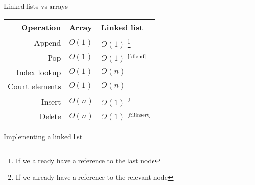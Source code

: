 \newcommand{\footnoteref}[1]{$^{\text{\ref{#1}}}$}

\begin{frame}{Linked lists vs arrays}
	\begin{center}
		\begin{tabular}{|r|l|l|}
			\hline
			\textbf{Operation} & \textbf{Array} & \textbf{Linked list} \\\hline
			\pause Append & $O(1)$ & $O(1)$ \footnote{\label{f:llend}If we already have a reference to the last node} \\
			\pause Pop & $O(1)$ & $O(1)$ \footnoteref{f:llend} \\
			\pause Index lookup & $O(1)$ & $O(n)$ \\
			\pause Count elements & $O(1)$ & $O(n)$ \\
			\pause Insert & $O(n)$ & $O(1)$ \footnote{\label{f:llinsert}If we already have a reference to the relevant node} \\
			\pause Delete & $O(n)$ & $O(1)$ \footnoteref{f:llinsert} \\
			\hline
		\end{tabular}
	\end{center}
\end{frame}

\begin{frame}{Implementing a linked list}
\end{frame}
